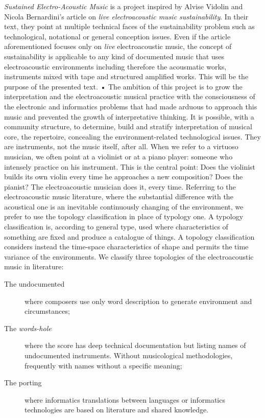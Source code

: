 \documentclass[
	a0,
	portrait
	]{a0poster}
\begin{document}
\noindent \emph{Sustained Electro-Acoustic Music} is a project inspired by Alvise Vidolin and Nicola Bernardini's article \cite{bevi05} on \emph{live electroacoustic music sustainability}. In their text, they point at multiple technical faces of the sustainability problem such as technological, notational or general conception issues. Even if the article aforementioned focuses only on \emph{live} electroacoustic music, the concept of sustainability is applicable to any kind of documented music that uses electroacoustic environments including therefore the acousmatic works, instruments mixed with tape and structured amplified works. This will be the purpose of the presented text. • 
The ambition of this project is to grow the interpretation and the electroacoustic musical practice with the consciousness of the electronic and informatics problems that had made arduous to approach this music and prevented the growth of interpretative thinking. It is possible, with a community structure, to determine, build and stratify interpretation of musical core, the repertoire, concealing the environment-related technological issues. They are instruments, not the music itself, after all.
When we refer to a virtuoso musician, we often point at a violinist or at a piano player: someone who intensely practice on his instrument. This is the central point: Does the violinist builds its own violin every time he approaches a new composition? Does the pianist? The electroacoustic musician does it, every time.
Referring to the electroacoustic music literature, where the substantial difference with the acoustical one is an inevitable continuously changing of the environment, we prefer to use the topology classification in place of typology one. A typology classification is, according to general type, used where characteristics of something are fixed and produce a catalogue of things. A topology classification considers instead the time-space characteristics of shape and permits the time variance of the environments. We classify three topologies of the electroacoustic music in literature:

\begin{description}
  \item[The undocumented] where composers use only word description to generate environment and circumstances;
  \item[The \emph{words-hole}] where the score has deep technical documentation but listing names of undocumented instruments. Without musicological methodologies, frequently with names without a specific meaning;
  \item[The porting] where informatics translations between languages or informatics technologies are based on literature and shared knowledge.
\end{description}
\end{document}
